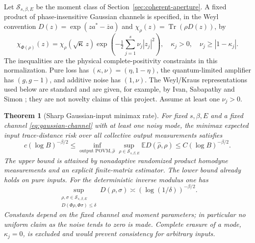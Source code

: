 \documentclass[11pt,a4paper]{article}
\newtheorem{theorem}{Theorem}[section]\newtheorem{proposition}[theorem]{Proposition}\newtheorem{corollary}[theorem]{Corollary}\newtheorem{lemma}[theorem]{Lemma}\newtheorem{remark}[theorem]{Remark}
\numberwithin{equation}{section}
\begin{document}
Let $\mathcal S_{s,\beta,E}$ be the moment class of
Section~\ref{sec:coherent-aperture}. A fixed product of phase-insensitive
Gaussian channels is specified, in the Weyl convention
$D(z)=\exp(za^*-\overline z a)$ and
$\chi_\rho(z)=\operatorname{Tr}(\rho D(z))$, by
\[
 \chi_{\Phi(\rho)}(z)
 =\chi_\rho(\sqrt{\boldsymbol\kappa}\,z)
             \exp\!\left(-\tfrac12\sum_{j=1}^s\nu_j|z_j|^2\right),
 \quad \kappa_j>0,\quad \nu_j\ge|1-\kappa_j|.
 \tag{D.1}\label{eq:gaussian-channel}
\]
The inequalities are the physical complete-positivity constraints in this
normalization. Pure loss has $(\kappa,\nu)=(\eta,1-\eta)$, the quantum-limited
amplifier has $(g,g-1)$, and additive noise has $(1,\nu)$.
The Weyl/Kraus representations used below are standard and are given, for
example, by Ivan, Sabapathy and Simon \cite{ISS2011}; they are not novelty
claims of this project. Assume at least one $\nu_j>0$.

\begin{theorem}[Sharp Gaussian-input minimax rate]\label{thm:gaussian-inverse}
For fixed $s,\beta,E$ and a fixed channel \eqref{eq:gaussian-channel} with at
least one noisy mode, the minimax expected input trace-distance risk over
all collective output measurements satisfies
\[
 \boxed{c(\log B)^{-\beta/2}\le
       \inf_{\text{output POVM},\widehat\rho}
          \sup_{\rho\in\mathcal S_{s,\beta,E}}
                   \mathbb E D(\widehat\rho,\rho)
             \le C(\log B)^{-\beta/2}.}
 \tag{D.2}\label{eq:gaussian-rate}
\]
The upper bound is attained by nonadaptive randomized product homodyne
measurements and an explicit finite-matrix estimator. The lower bound
already holds on pure inputs. For the deterministic inverse modulus one has
\[
 \sup_{\substack{\rho,\sigma\in\mathcal S_{s,\beta,E}\\
                    D(\Phi\rho,\Phi\sigma)\le\delta}}
                 D(\rho,\sigma)
       \asymp (\log(1/\delta))^{-\beta/2}.
 \tag{D.3}\label{eq:gaussian-modulus}
\]
Constants depend on the fixed channel and moment parameters; in particular
no uniform claim as the noise tends to zero is made. Complete erasure of a
mode, $\kappa_j=0$, is excluded and would prevent consistency for arbitrary
inputs.
\end{theorem}
\end{document}
